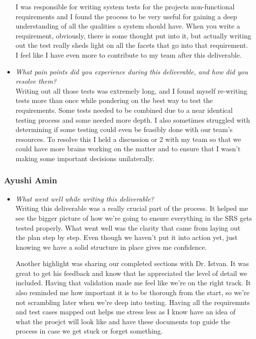 \documentclass[12pt, titlepage]{article}
\begin{document}
\begin{appendices}
\begin{itemize}
  I was responsible for writing system tests for the projects non-functional requirements and I found the process to be very useful for gaining a deep understanding of all the qualities a system should have. When you write a requirement, obviously, there is some thought put into it, but actually writing out the test really sheds light on all the facets that go into that requirement. I feel like I have even more to contribute to my team after this deliverable.

  \item \textit{What pain points did you experience during this deliverable, and how did you resolve them?}\\
  
  Writing out all those tests was extremely long, and I found myself re-writing tests more than once while pondering on the best way to test the requirements. Some tests needed to be combined due to a near identical testing process and some needed more depth. I also sometimes struggled with determining if some testing could even be feasibly done with our team's resources. To resolve this I held a discussion or 2 with my team so that we could have more brains working on the matter and to ensure that I wasn't making some important decisions unilaterally.
\end{itemize}

\subsubsection*{Ayushi Amin}
\begin{itemize}
  \item \textit{What went well while writing this deliverable?} \\ 

  Writing this deliverable was a really crucial part of the process. It 
  helped me see the bigger picture of how we’re going to ensure everything 
  in the SRS gets tested properly. What went well was the clarity that came 
  from laying out the plan step by step. Even though we haven’t put it into 
  action yet, just knowing we have a solid structure in place gives me confidence.
  
  Another highlight was sharing our completed sections with Dr. Istvan. It 
  was great to get his feedback and know that he appreciated the level of 
  detail we included. Having that validation made me feel like we’re on the 
  right track. It also reminded me how important it is to be thorough from 
  the start, so we’re not scrambling later when we’re deep into testing.
  Having all the requiremnts and test cases mapped out helps me stress less
  as I know have an idea of what the proejct will look like and have these 
  documents top guide the process in case we get stuck or forget something.


\end{itemize}
\end{appendices}
\end{document}
